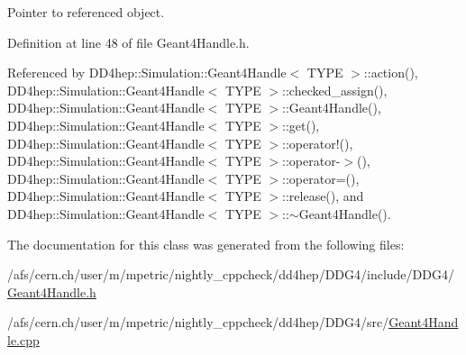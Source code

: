 Pointer to referenced object. 

Definition at line 48 of file Geant4Handle.h.

Referenced by DD4hep::Simulation::Geant4Handle$<$ TYPE $>$::action(), DD4hep::Simulation::Geant4Handle$<$ TYPE $>$::checked\_\-assign(), DD4hep::Simulation::Geant4Handle$<$ TYPE $>$::Geant4Handle(), DD4hep::Simulation::Geant4Handle$<$ TYPE $>$::get(), DD4hep::Simulation::Geant4Handle$<$ TYPE $>$::operator!(), DD4hep::Simulation::Geant4Handle$<$ TYPE $>$::operator-\/$>$(), DD4hep::Simulation::Geant4Handle$<$ TYPE $>$::operator=(), DD4hep::Simulation::Geant4Handle$<$ TYPE $>$::release(), and DD4hep::Simulation::Geant4Handle$<$ TYPE $>$::$\sim$Geant4Handle().

The documentation for this class was generated from the following files:\begin{DoxyCompactItemize}
\item 
/afs/cern.ch/user/m/mpetric/nightly\_\-cppcheck/dd4hep/DDG4/include/DDG4/\hyperlink{_geant4_handle_8h}{Geant4Handle.h}\item 
/afs/cern.ch/user/m/mpetric/nightly\_\-cppcheck/dd4hep/DDG4/src/\hyperlink{_geant4_handle_8cpp}{Geant4Handle.cpp}\end{DoxyCompactItemize}
